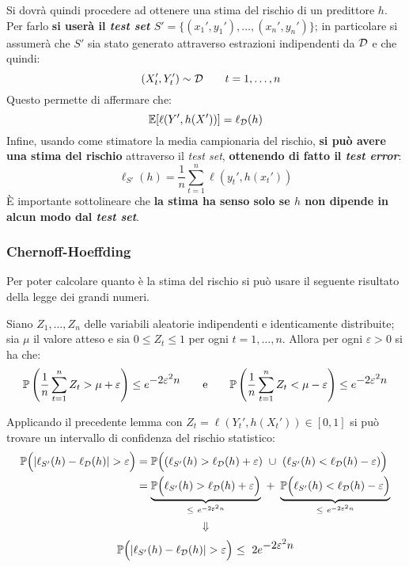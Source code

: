 Si dovrà quindi procedere ad ottenere una stima del rischio di un predittore $h$.
Per farlo 
\textbf{si userà il \textit{test set} $S'=\{(x_1',y_1'),\dots,(x_n',y_n')\}$};
in particolare si assumerà che $S'$ sia stato generato attraverso estrazioni 
indipendenti da $\mathcal{D}$ e che quindi:
\begin{equation}
    \quad (X_t',Y_t') \sim \mathcal{D} \tag*{$t=1,\dots,n$}
\end{equation}
Questo permette di affermare che:
$$ \mathbb{E}[\ell(Y',h(X'))] = \ell_{\mathcal{D}}(h) $$
Infine, usando come stimatore la media campionaria del rischio, \textbf{si può
avere una stima del rischio} attraverso il \textit{test set}, \textbf{ottenendo
di fatto il \textit{test error}}:
$$ \ell_{S'}(h) = \frac{1}{n}\sum_{t=1}^n \ell(y_t',h(x_t')) $$
È importante sottolineare che \textbf{la stima ha senso solo se $h$ non dipende
in alcun modo dal \textit{test set}}.

\subsubsection{Chernoff-Hoeffding}
Per poter calcolare quanto  è la stima del rischio si può usare
il seguente risultato della legge dei grandi numeri.

\begin{lemma}\label{lem:chern-hoeff}
    Siano $Z_1,\dots,Z_n$ delle variabili aleatorie indipendenti e
    identicamente distribuite; sia $\mu$ il valore atteso e sia $0\leq Z_t\leq1$
    per ogni $t=1,\dots,n$. Allora per ogni $\varepsilon>0$ si ha che:
    $$ \mathbb{P} \left(
        \frac{1}{n}\sum_{t=1}^n Z_t > \mu + \varepsilon
    \right) \leq e^{\displaystyle-2\varepsilon^2n}
    \qquad \text{e} \qquad
    \mathbb{P} \left(
        \frac{1}{n}\sum_{t=1}^n Z_t < \mu - \varepsilon
    \right) \leq e^{\displaystyle-2\varepsilon^2n} $$
\end{lemma}
\vspace{1em}

Applicando il precedente lemma con $Z_t = \ell(Y_t',h(X_t')) \in [0,1]$ si
può trovare un intervallo di confidenza del rischio statistico:
$$\begin{aligned}
    \Prob \Bigl( |\ell_{S'}(h) - \ell_\D(h)| > \varepsilon \Bigl) &= 
        \Prob\Bigl((\ell_{S'}(h) > \ell_\D(h)+\varepsilon) \ \cup \ 
        (\ell_{S'}(h) < \ell_\D(h)-\varepsilon) \Bigl)\\
    &= \underbrace{\Prob\Bigl(\ell_{S'}(h) > \ell_\D(h)+\varepsilon\Bigl)}
        _{\leq \ e^{-2\varepsilon^2n}} \ + \
       \underbrace{\Prob\Bigl(\ell_{S'}(h) < \ell_\D(h)-\varepsilon \Bigl)}
       _{\leq \ e^{-2\varepsilon^2n}}
\end{aligned}$$
$$ \Downarrow $$
$$ \mathbb{P} \Bigl( |\ell_{S'}(h) - \ell_{\mathcal{D}}(h)| > \varepsilon \Bigl) 
 \ \leq \ 2e^{\displaystyle-2\varepsilon^2n} $$

